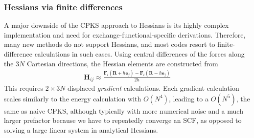 \documentclass[pdflatex,sn-mathphys-num]{sn-jnl}%
\theoremstyle{thmstyleone}%
\theoremstyle{thmstyletwo}%
\theoremstyle{thmstylethree}%
\begin{document}
\begin{appendices}
\subsubsection{Hessians via finite differences}
\label{sec:finite_difference}
A major downside of the CPKS approach to Hessians is its highly complex implementation and need for exchange-functional-specific derivations. Therefore, many new methods do not support Hessians, and most codes resort to finite-difference calculations in such cases. Using central differences of the forces along the $3N$ Cartesian directions, the Hessian elements are constructed from
\begin{align}
    \mathbf{H}_{ij} \approx \frac{\mathbf{F}_i(\mathbf{R} + h \mathbf{e}_j) - \mathbf{F}_i(\mathbf{R} - h \mathbf{e}_j)}{2h}
\end{align}
This requires $2\times 3N$ displaced \emph{gradient} calculations. Each gradient calculation scales similarly to the energy calculation with $O(N^4)$, leading to a $O(N^5)$, the same as naive CPKS, although typically with more numerical noise and a much larger prefactor because we have to repeatedly converge an SCF, as opposed to solving a large linear system in analytical Hessians.
% 

\end{appendices}
\end{document}
